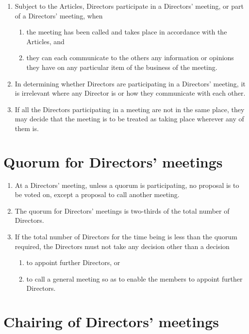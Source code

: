 \documentclass[a4paper,12pt]{article}
\begin{document}
\begin{enumerate}
  \item Subject to the Articles, Directors participate in a Directors’ meeting, or part of a Directors’ meeting, when
  \begin{enumerate}
    \item the meeting has been called and takes place in accordance with the Articles, and
    \item they can each communicate to the others any information or opinions they have on any particular item of the business of the meeting.
  \end{enumerate}
  \item In determining whether Directors are participating in a Directors’ meeting, it is irrelevant where any Director is or how they communicate with each other.
  \item If all the Directors participating in a meeting are not in the same place, they may decide that the meeting is to be treated as taking place wherever any of them is.
\end{enumerate}

\section{Quorum for Directors’ meetings}

\begin{enumerate}
  \item At a Directors’ meeting, unless a quorum is participating, no proposal is to be voted on, except a proposal to call another meeting.
  \item The quorum for Directors’ meetings is two-thirds of the total number of Directors. %
  \item If the total number of Directors for the time being is less than the quorum required, the Directors must not take any decision other than a decision
  \begin{enumerate}
    \item to appoint further Directors, or
    \item to call a general meeting so as to enable the members to appoint further Directors.
  \end{enumerate}
\end{enumerate}

\section{Chairing of Directors' meetings}
\end{document}
